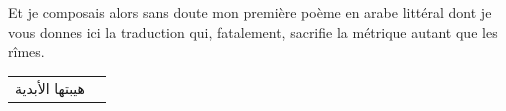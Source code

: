 \begin{prose}
  Et je composais alors sans doute mon première poème en arabe littéral dont je vous donnes ici la traduction qui, fatalement, sacrifie la métrique autant que les rîmes.
\end{prose}

\begin{longtable}{R{0.3\textwidth} L{0.65\textwidth}}


  \endfirsthead
  \vspace{0.05cm}

  \textarabic{هيبتها الأبدية}         & \vspace{0.05cm}


\end{longtable}
